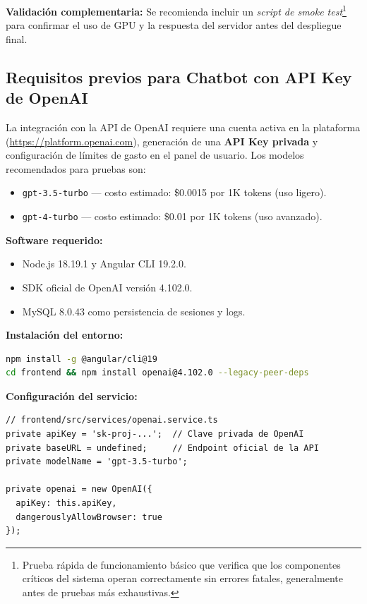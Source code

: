 \documentclass[12pt,a4paper]{report}
\numberwithin{figure}{section}
\begin{document}
\noindent \textbf{Validación complementaria:}  
Se recomienda incluir un \textit{script de smoke test}\footnote{Prueba rápida de funcionamiento básico que verifica que los componentes críticos del sistema operan correctamente sin errores fatales, generalmente antes de pruebas más exhaustivas.} para confirmar el uso de GPU y la respuesta del servidor antes del despliegue final.

\subsection[Requisitos para Chatbot con OpenAI]{Requisitos previos para Chatbot con API Key de OpenAI}
\label{subsec:req_openai_chatbot}

La integración con la API de OpenAI requiere una cuenta activa en la plataforma (\url{https://platform.openai.com}), generación de una \textbf{API Key privada} y configuración de límites de gasto en el panel de usuario.  
Los modelos recomendados para pruebas son:
\begin{itemize}
  \item \texttt{gpt-3.5-turbo} — costo estimado: \$0.0015 por 1K tokens (uso ligero).
  \item \texttt{gpt-4-turbo} — costo estimado: \$0.01 por 1K tokens (uso avanzado).
\end{itemize}

\vspace{0.5em}
\noindent \textbf{Software requerido:}
\begin{itemize}
  \item Node.js 18.19.1 y Angular CLI 19.2.0.
  \item SDK oficial de OpenAI versión 4.102.0.
  \item MySQL 8.0.43 como persistencia de sesiones y logs.
\end{itemize}

\vspace{0.5em}
\noindent \textbf{Instalación del entorno:}
\begin{lstlisting}[style=angelcode,language=bash,caption={Instalación del entorno para conexión con OpenAI}]
npm install -g @angular/cli@19
cd frontend && npm install openai@4.102.0 --legacy-peer-deps
\end{lstlisting}

\vspace{0.5em}
\noindent \textbf{Configuración del servicio:}
\begin{lstlisting}[style=angelcode,caption={Servicio Angular para conexión con OpenAI (API oficial)}]
// frontend/src/services/openai.service.ts
private apiKey = 'sk-proj-...';  // Clave privada de OpenAI
private baseURL = undefined;     // Endpoint oficial de la API
private modelName = 'gpt-3.5-turbo';

private openai = new OpenAI({
  apiKey: this.apiKey,
  dangerouslyAllowBrowser: true
});
\end{lstlisting}
\end{document}
